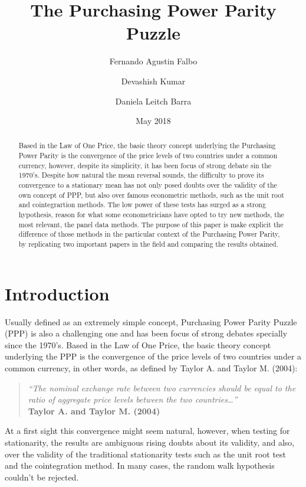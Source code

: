 \documentclass[]{article}
\title{The Purchasing Power Parity Puzzle}
\author{Fernando Agustin Falbo \and Devashish Kumar \and Daniela Leitch Barra}
\date{May 2018}
\begin{document}
\maketitle
\begin{abstract}
Based in the Law of One Price, the basic theory concept underlying the Purchasing Power Parity is the convergence of the price levels of two countries under a common currency, however, despite its simplicity, it has been focus of strong debate sin the 1970's. Despite how natural the mean reversal sounds, the difficulty to prove its convergence to a stationary mean has not only posed doubts over the validity of the own concept of PPP, but also over famous econometric methods, such as the unit root and cointegrartion methods. The low power of these tests has surged as a strong hypothesis, reason for what some econometricians have opted to try new methods, the most relevant, the panel data methods. The purpose of this paper is make explicit the difference of those methods in the particular context of the Purchasing Power Parity, by replicating two important papers in the field and comparing the results obtained.
\end{abstract}

\hypertarget{introduction}{%
\section{Introduction}\label{introduction}}

Usually defined as an extremely simple concept, Purchasing Power Parity Puzzle (PPP)
is also a challenging one and has been focus of strong debates specially since the 1970's.
Based in the Law of One Price, the basic theory concept underlying the PPP is the
convergence of the price levels of two countries under a common currency, in other words,
as defined by Taylor A. and Taylor M. (2004):

\begin{quote}
\emph{``The nominal exchange rate between two currencies should be equal to the ratio of aggregate price levels between the two countries\ldots{}''}\\
\textbf{Taylor A. and Taylor M. (2004)}
\end{quote}

At a first sight this convergence might seem natural, however, when testing for stationarity, the results are ambiguous rising doubts about its validity, and also, over the validity of the traditional stationarity tests such as the unit root test and the cointegration method. In many cases, the random walk hypothesis couldn't be rejected.
\end{document}

